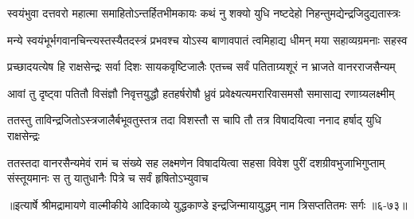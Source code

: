 \twolineshloka
{स्वयंभुवा दत्तवरो महात्मा समाहितोऽन्तर्हितभीमकायः}
{कथं नु शक्यो युधि नष्टदेहो निहन्तुमद्येन्द्रजिदुद्यतास्त्रः} %

\twolineshloka
{मन्ये स्वयंभूर्भगवानचिन्त्यस्तस्यैतदस्त्रं प्रभवश्च योऽस्य}
{बाणावपातं त्वमिहाद्य धीमन् मया सहाव्यग्रमनाः सहस्व} %

\twolineshloka
{प्रच्छादयत्येष हि राक्षसेन्द्रः सर्वा दिशः सायकवृष्टिजालैः}
{एतच्च सर्वं पतिताग्र्यशूरं न भ्राजते वानरराजसैन्यम्} %

\twolineshloka
{आवां तु दृष्ट्वा पतितौ विसंज्ञौ निवृत्तयुद्धौ हतहर्षरोषौ}
{ध्रुवं प्रवेक्ष्यत्यमरारिवासमसौ समासाद्य रणाग्र्यलक्ष्मीम्} %

\twolineshloka
{ततस्तु ताविन्द्रजितोऽस्त्रजालैर्बभूवतुस्तत्र तदा विशस्तौ}
{स चापि तौ तत्र विषादयित्वा ननाद हर्षाद् युधि राक्षसेन्द्रः} %

\threelineshloka
{ततस्तदा वानरसैन्यमेवं रामं च संख्ये सह लक्ष्मणेन}
{विषादयित्वा सहसा विवेश पुरीं दशग्रीवभुजाभिगुप्ताम्}
{संस्तूयमानः स तु यातुधानैः पित्रे च सर्वं हृषितोऽभ्युवाच} %


॥इत्यार्षे श्रीमद्रामायणे वाल्मीकीये आदिकाव्ये युद्धकाण्डे इन्द्रजिन्मायायुद्धम् नाम त्रिसप्ततितमः सर्गः ॥६-७३॥
